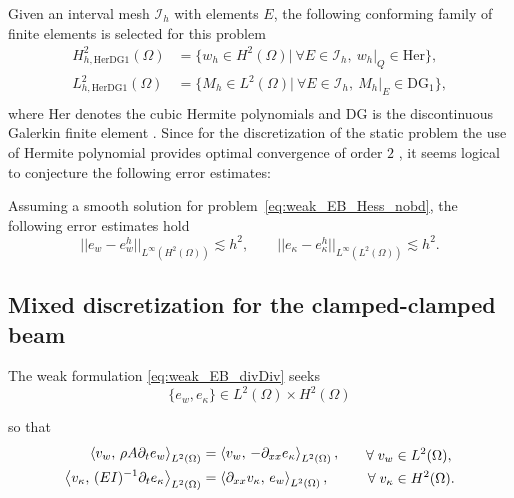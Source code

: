 Given an interval mesh $\mathcal{I}_h$ with elements $E$, the following conforming family of finite elements is selected for this problem
\begin{equation}
\label{eq:HerDG1}
\begin{aligned}
H_{h, \text{HerDG1}}^{2}(\Omega) &= \{ w_h \in H^{2}(\Omega) | \ \forall E \in \mathcal{I}_h,\ w_h|_{Q} \in \mathrm{Her} \}, \\ 
L_{h, \text{HerDG1}}^2(\Omega) &= \{M_h \in L^2(\Omega) | \ \forall E \in \mathcal{I}_h, \ M_h|_{E} \in \mathrm{DG}_{1} \}, \\
\end{aligned}
\end{equation}
where Her denotes the cubic Hermite polynomials and DG is the discontinuous Galerkin finite element \cite[Chapter 3]{logg2012}.  Since for the discretization of the static problem the use of Hermite polynomial provides optimal convergence of order $2$ \cite{hughes2012finite}, it seems logical to conjecture the following error estimates:

\begin{conjecture}\label{conj:HerDG1estimates}
	Assuming a smooth solution for problem~\eqref{eq:weak_EB_Hess_nobd}, the following error estimates hold
	\begin{equation}
	\label{eq:errHerDG1}
	||e_w - e_w^h||_{L^{\infty} (H^2(\Omega))} \lesssim h^{2}, \qquad
	||e_\kappa - e_\kappa^h||_{L^{\infty} (L^2(\Omega))} \lesssim h^{2}.
	\end{equation}
\end{conjecture}


\subsection{Mixed discretization for the clamped-clamped beam}
The weak formulation \eqref{eq:weak_EB_divDiv} seeks 
\begin{equation*}
\{e_w, e_\kappa\} \in L^2(\Omega) \times H^2(\Omega) 
\end{equation*}

so that
\begin{equation}\label{eq:weak_EB_divDiv_nobd}
\begin{aligned}
\inner[L^2(\Omega)]{v_w}{\rho A \partial_t e_w} &= \inner[L^2(\Omega)]{v_w}{-\partial_{xx} e_\kappa} , \\
\inner[L^2(\Omega)]{v_\kappa}{(EI)^{-1} \partial_t e_\kappa} &= \inner[L^2(\Omega)]{\partial_{xx} v_\kappa}{ e_w}, \\
\end{aligned}\qquad
\begin{aligned}
\forall \; v_w &\in L^2(\Omega), \\
\forall \; v_\kappa &\in H^2(\Omega).
\end{aligned}
\end{equation}

